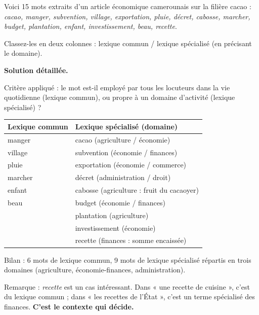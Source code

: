 \documentclass[11pt]{article}
\begin{document}
\begin{exoresolu}
Voici 15 mots extraits d'un article économique camerounais sur la filière cacao : \emph{cacao, manger, subvention, village, exportation, pluie, décret, cabosse, marcher, budget, plantation, enfant, investissement, beau, recette}.

Classez-les en deux colonnes : lexique commun / lexique spécialisé (en précisant le domaine).

\tcblower
\textbf{Solution détaillée.}

Critère appliqué : le mot est-il employé par tous les locuteurs dans la vie quotidienne (lexique commun), ou propre à un domaine d'activité (lexique spécialisé) ?

\begin{center}
\begin{tabularx}{\linewidth}{|X|X|}
\hline
\rowcolor{popblueL} \textbf{Lexique commun} & \textbf{Lexique spécialisé (domaine)} \\
\hline
manger & cacao (agriculture / économie) \\
\hline
village & subvention (économie / finances) \\
\hline
pluie & exportation (économie / commerce) \\
\hline
marcher & décret (administration / droit) \\
\hline
enfant & cabosse (agriculture : fruit du cacaoyer) \\
\hline
beau & budget (économie / finances) \\
\hline
 & plantation (agriculture) \\
\hline
 & investissement (économie) \\
\hline
 & recette (finances : somme encaissée) \\
\hline
\end{tabularx}
\end{center}

Bilan : 6 mots de lexique commun, 9 mots de lexique spécialisé répartis en trois domaines (agriculture, économie-finances, administration).

Remarque : \emph{recette} est un cas intéressant. Dans « une recette de cuisine », c'est du lexique commun ; dans « les recettes de l'État », c'est un terme spécialisé des finances. \textbf{C'est le contexte qui décide.}
\end{exoresolu}
\end{document}
